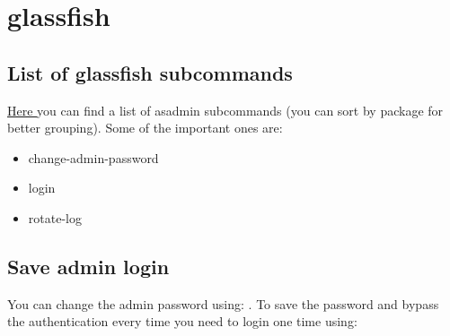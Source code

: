 \section{glassfish}
\subsection {List of glassfish subcommands}
\href{https://wikis.oracle.com/display/GlassFish/GlassFish+Server+4.0+asadmin+Subcommands}{Here }you can find a list of asadmin subcommands (you can sort by package for better grouping). Some of the important ones are:
\begin{itemize}
	\item change-admin-password
	\item login
	\item rotate-log
\end{itemize}
\subsection {Save admin login}
You can change the admin password using: . To save the password and bypass the authentication every time you need to login one time using: 

